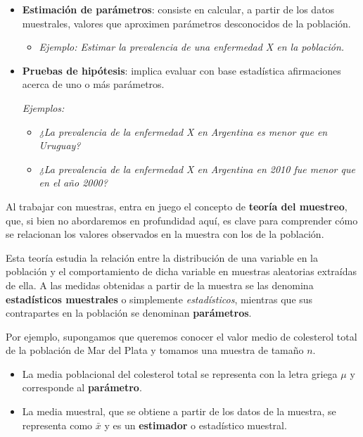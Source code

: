 \documentclass[
  spanish,
  a4paper,
]{scrbook}
\providecommand{\tightlist}{%
  \setlength{\itemsep}{0pt}\setlength{\parskip}{0pt}}
\begin{document}
\begin{itemize}
\item
  \textbf{Estimación de parámetros}: consiste en calcular, a partir de
  los datos muestrales, valores que aproximen parámetros desconocidos de
  la población.

  \begin{itemize}
  \tightlist
  \item
    \emph{Ejemplo: Estimar la prevalencia de una enfermedad X en la
    población.}
  \end{itemize}
\item
  \textbf{Pruebas de hipótesis}: implica evaluar con base estadística
  afirmaciones acerca de uno o más parámetros.

  \emph{Ejemplos:}

  \begin{itemize}
  \item
    \emph{¿La prevalencia de la enfermedad X en Argentina es menor que
    en Uruguay?}
  \item
    \emph{¿La prevalencia de la enfermedad X en Argentina en 2010 fue
    menor que en el año 2000?}
  \end{itemize}
\end{itemize}

Al trabajar con muestras, entra en juego el concepto de \textbf{teoría
del muestreo}, que, si bien no abordaremos en profundidad aquí, es clave
para comprender cómo se relacionan los valores observados en la muestra
con los de la población.

Esta teoría estudia la relación entre la distribución de una variable en
la población y el comportamiento de dicha variable en muestras
aleatorias extraídas de ella. A las medidas obtenidas a partir de la
muestra se las denomina \textbf{estadísticos muestrales} o simplemente
\emph{estadísticos}, mientras que sus contrapartes en la población se
denominan \textbf{parámetros}.

Por ejemplo, supongamos que queremos conocer el valor medio de
colesterol total de la población de Mar del Plata y tomamos una muestra
de tamaño \(n\).

\begin{itemize}
\item
  La media poblacional del colesterol total se representa con la letra
  griega \(\mu\) y corresponde al \textbf{parámetro}.
\item
  La media muestral, que se obtiene a partir de los datos de la muestra,
  se representa como \(\bar{x}\) y es un \textbf{estimador} o
  estadístico muestral.
\end{itemize}
\end{document}
